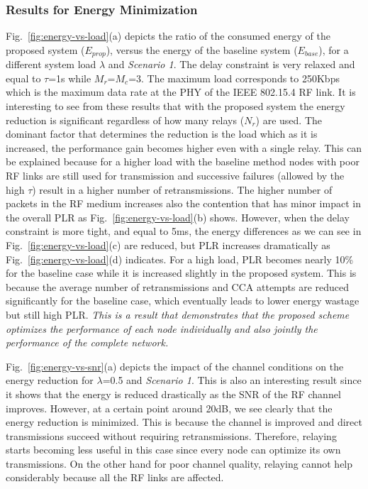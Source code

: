 \documentclass[10pt]{IEEEtran}
\newcounter{section:outage-analysis}
\begin{document}
\subsubsection{Results for Energy Minimization}
Fig.~\ref{fig:energy-vs-load}(a) depicts the ratio of the consumed energy of the proposed system ($E_{prop}$), versus the energy of the baseline system ($E_{base}$), for a different system load $\lambda$ and \emph{Scenario 1}. The delay constraint is very relaxed and equal to $\tau$=1s while $M_r$=$M_c$=3. The maximum load corresponds to 250Kbps which is the maximum data rate at the PHY of the IEEE 802.15.4 RF link. It is interesting to see from these results that with the proposed system the energy reduction is significant regardless of how many relays ($N_r$) are used. The dominant factor that determines the reduction is the load which as it is increased, the performance gain becomes higher even with a single relay. This can be explained because for a higher load with the baseline method nodes with poor RF links are still used for transmission and successive failures (allowed by the high $\tau$) result in a higher number of retransmissions. The higher number of packets in the RF medium increases also the contention that has minor impact in the overall PLR as Fig.~\ref{fig:energy-vs-load}(b) shows. However, when the delay constraint is more tight, and equal to 5ms, the energy differences as we can see in Fig.~\ref{fig:energy-vs-load}(c) are reduced, but PLR increases dramatically as Fig.~\ref{fig:energy-vs-load}(d) indicates. For a high load, PLR becomes nearly 10\% for the baseline case while it is increased slightly in the proposed system. This is because the average number of retransmissions and CCA attempts are reduced significantly for the baseline case, which eventually leads to lower energy wastage but still high PLR. \emph{This is a result that demonstrates  that the proposed scheme optimizes the performance of each node individually and also jointly the performance of the complete network.}

Fig.~\ref{fig:energy-vs-snr}(a) depicts the impact of the channel conditions on the energy reduction for $\lambda$=0.5 and \emph{Scenario 1}. This is also an interesting result since it shows that the energy is reduced drastically as the SNR of the RF channel improves. However, at a certain point around 20dB, we see clearly that the energy reduction is minimized. This is because the channel is improved and direct transmissions succeed without requiring retransmissions. Therefore, relaying starts becoming less useful in this case since every node can optimize its own transmissions. On the other hand for poor channel quality, relaying cannot help considerably because all the RF links are affected.
\end{document}
